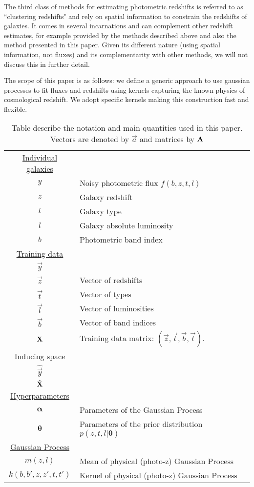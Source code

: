 \documentclass[aps,prd,showpacs,superscriptaddress,groupedaddress]{revtex4}  %
\begin{document}
The third class of methods for estimating photometric redshifts is referred to as ``clustering redshifts" and rely on spatial information to constrain the redshifts of galaxies.
It comes in several incarnations and can complement other redshift estimates, for example provided by the methods described above and also the method presented in this paper.
Given its different nature (using spatial information, not fluxes) and its complementarity with other methods, we will not discuss this in further detail.


The scope of this paper is as follows: we define a generic approach to use gaussian processes to fit fluxes and redshifts using kernels capturing the known physics of cosmological redshift.
We adopt specific kernels making this construction fast and flexible.


\begin{table}
\begin{tabular}{cll}
\hline
 \underline{Individual galaxies} \\
$y$ & Noisy photometric flux $f(b,z,t,l)$\\
$z$ & Galaxy redshift \\
$t$ & Galaxy type \\
$l$ & Galaxy absolute luminosity \\
$b$ & Photometric band index \\\hline
 \underline{Training data} \\ 
$\vec{y}$		&	\\
$\vec{z}$ & Vector of redshifts\\
$\vec{t}$ & Vector of types  \\
$\vec{l}$ & Vector of luminosities  \\
$\vec{b}$ & Vector of band indices  \\
$\mat{X}$ & Training data matrix: $(\vec{z},\vec{t},\vec{b},\vec{l})$. \\\hline
Inducing space\\\hline
$\hat{\vec{y}}$		&	\\
$\hat{\mat{X}}$\\\hline
 \underline{Hyperparameters}\\
$\bm{\alpha}$	& Parameters of the Gaussian Process\\
$\bm{\theta}$	& Parameters of the prior distribution $p(z,t,l|\bm{\theta})$ \\\hline
 \underline{Gaussian Process} \\
$m(z,l)$ 	& Mean of physical (photo-z) Gaussian Process \\
$k(b,b',z,z',t,t')$ & Kernel of physical (photo-z) Gaussian Process   \\\hline
\end{tabular}
\caption{Table describe the notation and main quantities used in this paper. Vectors are denoted by $\vec{a}$ and matrices by $\mat{A}$} 
\end{table}
\end{document}
